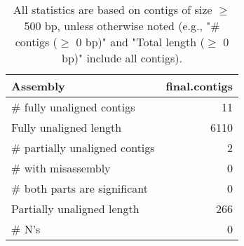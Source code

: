\documentclass[12pt,a4paper]{article}
\begin{document}
\begin{table}[ht]
\begin{center}
\caption{All statistics are based on contigs of size $\geq$ 500 bp, unless otherwise noted (e.g., "\# contigs ($\geq$ 0 bp)" and "Total length ($\geq$ 0 bp)" include all contigs).}
\begin{tabular}{|l*{1}{|r}|}
\hline
Assembly & final.contigs \\ \hline
\# fully unaligned contigs & 11 \\ \hline
Fully unaligned length & 6110 \\ \hline
\# partially unaligned contigs & 2 \\ \hline
\hspace{5mm}\# with misassembly & 0 \\ \hline
\hspace{5mm}\# both parts are significant & 0 \\ \hline
Partially unaligned length & 266 \\ \hline
\# N's & 0 \\ \hline
\end{tabular}
\end{center}
\end{table}
\end{document}
